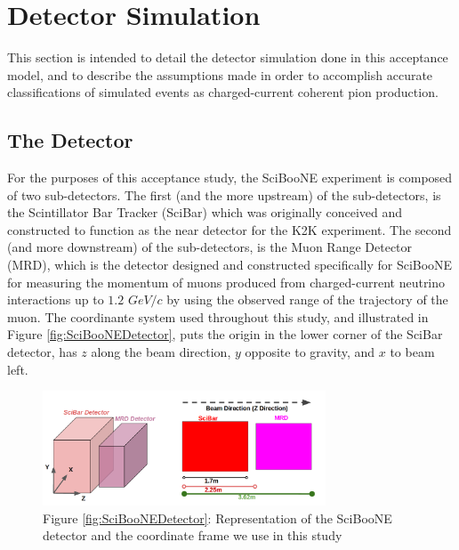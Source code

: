 \documentclass[11pt]{article}
\begin{document}
\section{Detector Simulation}\label{sec:simulation}
This section is intended to detail the detector simulation done in this acceptance model, and to describe the assumptions made in order to accomplish accurate classifications of simulated events as charged-current coherent pion production.

\subsection{The Detector}\label{subsec:detector}
For the purposes of this acceptance study, the SciBooNE experiment is composed of two sub-detectors. The first (and the more upstream) of the sub-detectors, is the Scintillator Bar Tracker (SciBar) which was originally conceived and constructed to function as the near detector for the K2K experiment. The second (and more downstream) of the sub-detectors, is the Muon Range Detector (MRD), which is the detector designed and constructed specifically for SciBooNE for measuring the momentum of muons produced from charged-current neutrino interactions up to $1.2$ $GeV/c$ by using the observed range of the trajectory of the muon. The coordinante system used throughout this study, and illustrated in  Figure \ref*{fig:SciBooNEDetector}, puts the origin in the lower corner of the SciBar detector, has $z$ along the beam direction, $y$ opposite to gravity, and $x$ to beam left. 

\begin{figure}[H]
\centering
\includegraphics[width=0.75\textwidth]{EventClassifications/SciBooNEDetector.png}
\caption*{Figure \ref*{fig:SciBooNEDetector}: Representation of the SciBooNE detector and the coordinate frame we use in this study}
\end{figure}\label{fig:SciBooNEDetector}
\end{document}
